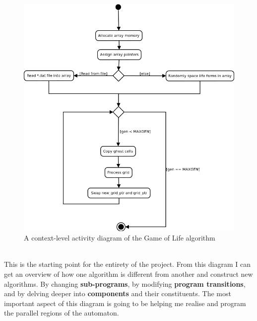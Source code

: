 \documentclass[11pt]{article} %
\begin{document}
\begin{figure}[h]
\centering
\includegraphics[scale=0.5]{sequential0.png}
\caption{A context-level activity diagram of the Game of Life algorithm}
\label{fig: Algo0}
\end{figure}
\\This is the starting point for the entirety of the project. From this diagram I can get an overview of how one algorithm is different from another and construct new algorithms. By changing {\bf sub-programs}, by modifying {\bf program transitions}, and by delving deeper into {\bf components} and their constituents. The most important aspect of this diagram is going to be helping me realise and program the parallel regions of the automaton.
\end{document}

